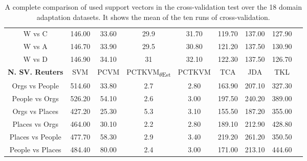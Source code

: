 \begin{table}[]
{\begin{tabular}{@{}ccccccccc@{}}
			W vs C                           & 146.00 & 33.60  & 29.9                               & 31.70  & 119.70 & 137.00 & 127.90 \\
			W vs A                           & 146.70 & 33.90  & 29.5                               & 30.80  & 121.20 & 137.50 & 130.90 \\
			W vs D                           & 146.90 & 34.10  & 31                               & 32.10  & 122.30 & 137.50 & 126.70 \\ \midrule
			\textbf{N. SV. Reuters}        & SVM    & PCVM   & PCTKVM\textsubscript{$\theta$Est} & PCTKVM & TCA    & JDA    & TKL    \\ \midrule
			Orgs vs People                   & 514.60 & 33.80  & 2.7                               & 2.80   & 163.90 & 207.10 & 327.30 \\
			People vs Orgs                   & 526.20 & 54.10  & 2.6                               & 3.00   & 197.50 & 240.20 & 389.00 \\
			Orgs vs Places                   & 427.20 & 25.30  & 5.3                               & 3.10   & 155.50 & 187.20 & 355.00 \\
			Places vs Orgs                   & 464.00 & 30.10  & 2.2                               & 2.80   & 189.10 & 212.90 & 428.80 \\
			Places vs People                 & 477.70 & 58.30  & 2.9                               & 3.40   & 219.20 & 261.20 & 350.50 \\
			People vs Places                 & 484.40 & 80.00  & 2.4                               & 3.00   & 171.00 & 213.10 & 444.60 \\ \bottomrule
	\end{tabular}}
	\caption[Number of used Support Vectors from Cross-Validation]{A complete comparison of used support vectors in the cross-validation test over the 18 domain adaptation datasets. It shows the mean of the ten runs of cross-validation.\label{BTableFTNev}}
\end{table}
\FloatBarrier

